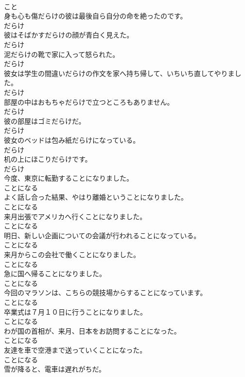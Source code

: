 \documentclass[8pt]{extreport}
\begin{document}
\begin{CJK}{UTF8}{min}
\\	こと
\\	身も心も傷だらけの彼は最後自ら自分の命を絶ったのです。	
\\	だらけ
\\	彼はそばかすだらけの顔が青白く見えた。	
\\	だらけ
\\	泥だらけの靴で家に入って怒られた。	
\\	だらけ
\\	彼女は学生の間違いだらけの作文を家へ持ち帰して、いちいち直してやりました。	
\\	だらけ
\\	部屋の中はおもちゃだらけで立つところもありません。	
\\	だらけ
\\	彼の部屋はゴミだらけだ。	
\\	だらけ
\\	彼女のベッドは包み紙だらけになっている。	
\\	だらけ
\\	机の上にほこりだらけです。	
\\	だらけ
\\	今度、東京に転勤することになりました。	
\\	ことになる
\\	よく話し合った結果、やはり離婚ということになりました。	
\\	ことになる
\\	来月出張でアメリカへ行くことになりました。	
\\	ことになる
\\	明日、新しい企画についての会議が行われることになっている。	
\\	ことになる
\\	来月からこの会社で働くことになりました。	
\\	ことになる
\\	急に国へ帰ることになりました。	
\\	ことになる
\\	今回のマラソンは、こちらの競技場からすることになっています。	
\\	ことになる
\\	卒業式は７月１０日に行うことになりました。	
\\	ことになる
\\	わが国の首相が、来月、日本をお訪問することになった。	
\\	ことになる
\\	友達を車で空港まで送っていくことになった。	
\\	ことになる
\\	雪が降ると、電車は遅れがちだ。	

\end{CJK}
\end{document}
